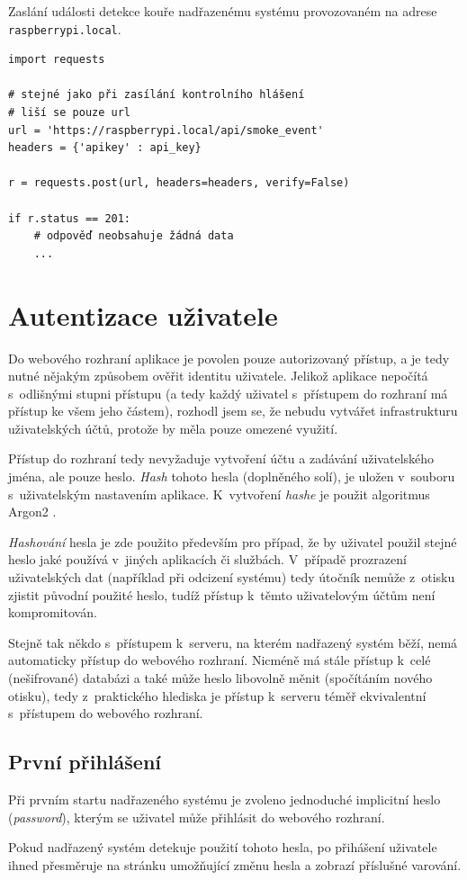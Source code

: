 \begin{listing}[htbp]
\caption{\label{lst:api_report} Zaslání události detekce kouře nadřazenému systému provozovaném na adrese \texttt{raspberrypi.local}.}
\begin{verbatim}
import requests

# stejné jako při zasílání kontrolního hlášení
# liší se pouze url
url = 'https://raspberrypi.local/api/smoke_event'
headers = {'apikey' : api_key}

r = requests.post(url, headers=headers, verify=False)

if r.status == 201:
    # odpověď neobsahuje žádná data
    ...

\end{verbatim}
\end{listing}

\section{Autentizace uživatele}
\label{sec:de_auth}

Do webového rozhraní aplikace je povolen pouze autorizovaný přístup, a je tedy nutné nějakým způsobem ověřit identitu uživatele. Jelikož aplikace nepočítá s~odlišnými stupni přístupu (a tedy každý uživatel s~přístupem do rozhraní má přístup ke všem jeho částem), rozhodl jsem se, že nebudu vytvářet infrastrukturu uživatelských účtů, protože by měla pouze omezené využití.

Přístup do rozhraní tedy nevyžaduje vytvoření účtu a zadávání uživatelského jména, ale pouze heslo. \textit{Hash} tohoto hesla (doplněného solí), je uložen v~souboru s~uživatelským nastavením aplikace. K~vytvoření \textit{hashe} je použit algoritmus Argon2 \cite{argon2}.

\textit{Hashování} hesla je zde použito především pro případ, že by uživatel použil stejné heslo jaké používá v~jiných aplikacích či službách. V~případě prozrazení uživatelských dat (například při odcizení systému) tedy útočník nemůže z~otisku zjistit původní použité heslo, tudíž přístup k~těmto uživatelovým účtům není kompromitován.

Stejně tak někdo s~přístupem k~serveru, na kterém nadřazený systém běží, nemá automaticky přístup do webového rozhraní. Nicméně má stále přístup k~celé (nešifrované) databázi a také může heslo libovolně měnit (spočítáním nového otisku), tedy z~praktického hlediska je přístup k~serveru téměř ekvivalentní s~přístupem do webového rozhraní.

\subsection{První přihlášení}

Při prvním startu nadřazeného systému je zvoleno jednoduché implicitní heslo (\textit{password}), kterým se uživatel může přihlásit do webového rozhraní. 

Pokud nadřazený systém detekuje použití tohoto hesla, po přihášení uživatele ihned přesměruje na stránku umožňující změnu hesla a zobrazí příslušné varování.